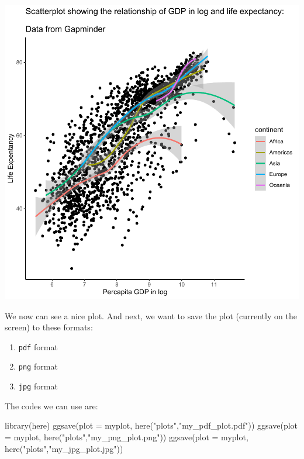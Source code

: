 \documentclass[
]{book}
\makeatletter
\newenvironment{Shaded}{\begin{snugshade}}{\end{snugshade}}
\newcommand{\AttributeTok}[1]{\textcolor[rgb]{0.61,0.61,0.61}{#1}}
\newcommand{\FunctionTok}[1]{\textcolor[rgb]{0,0,0}{#1}}
\newcommand{\NormalTok}[1]{#1}
\newcommand{\StringTok}[1]{\textcolor[rgb]{0.5,0.5,0.5}{#1}}
\providecommand{\tightlist}{%
  \setlength{\itemsep}{0pt}\setlength{\parskip}{0pt}}
\newenvironment{kframe}{%
\medskip{}
\setlength{\fboxsep}{.8em}
 \def\at@end@of@kframe{}%
 \ifinner\ifhmode%
  \def\at@end@of@kframe{\end{minipage}}%
  \begin{minipage}{\columnwidth}%
 \fi\fi%
 \def\FrameCommand##1{\hskip\@totalleftmargin \hskip-\fboxsep
 \colorbox{shadecolor}{##1}\hskip-\fboxsep
     \hskip-\linewidth \hskip-\@totalleftmargin \hskip\columnwidth}%
 \MakeFramed {\advance\hsize-\width
   \@totalleftmargin\z@ \linewidth\hsize
   \@setminipage}}%
 {\par\unskip\endMakeFramed%
 \at@end@of@kframe}
\renewenvironment{Shaded}{\begin{kframe}}{\end{kframe}}
\makeatother
\begin{document}
\begin{center}\includegraphics[width=0.7\linewidth,keepaspectratio]{Multivariable_Data_Analysis_files/figure-latex/unnamed-chunk-43-1} \end{center}

We now can see a nice plot. And next, we want to save the plot (currently on the screen) to these formats:

\begin{enumerate}
\def\labelenumi{\arabic{enumi}.}
\tightlist
\item
  \texttt{pdf} format
\item
  \texttt{png} format
\item
  \texttt{jpg} format
\end{enumerate}

The codes we can use are:

\begin{Shaded}
\begin{Highlighting}[]
\FunctionTok{library}\NormalTok{(here)}
\FunctionTok{ggsave}\NormalTok{(}\AttributeTok{plot =}\NormalTok{ myplot, }\FunctionTok{here}\NormalTok{(}\StringTok{"plots"}\NormalTok{,}\StringTok{"my\_pdf\_plot.pdf"}\NormalTok{))}
\FunctionTok{ggsave}\NormalTok{(}\AttributeTok{plot =}\NormalTok{ myplot, }\FunctionTok{here}\NormalTok{(}\StringTok{"plots"}\NormalTok{,}\StringTok{"my\_png\_plot.png"}\NormalTok{)) }
\FunctionTok{ggsave}\NormalTok{(}\AttributeTok{plot =}\NormalTok{ myplot, }\FunctionTok{here}\NormalTok{(}\StringTok{"plots"}\NormalTok{,}\StringTok{"my\_jpg\_plot.jpg"}\NormalTok{))}
\end{Highlighting}
\end{Shaded}
\end{document}
